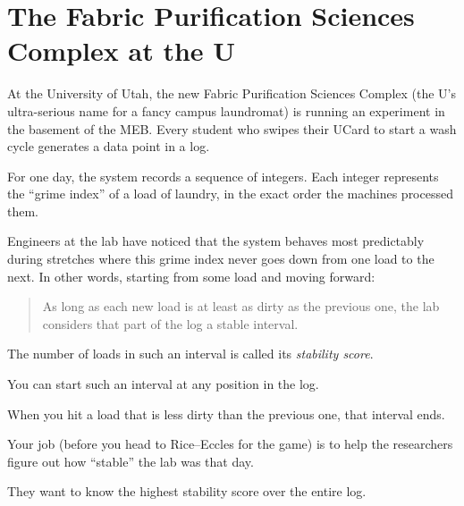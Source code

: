 \section*{The Fabric Purification Sciences Complex at the U}

At the University of Utah, the new Fabric Purification Sciences Complex (the U's
ultra-serious name for a fancy campus laundromat) is running an experiment in
the basement of the MEB. Every student who swipes their UCard to start a wash
cycle generates a data point in a log.

For one day, the system records a sequence of integers. Each integer represents
the ``grime index'' of a load of laundry, in the exact order the machines
processed them.

Engineers at the lab have noticed that the system behaves most predictably
during stretches where this grime index never goes down from one load to the
next. In other words, starting from some load and moving forward:
\begin{quote}
As long as each new load is at least as dirty as the previous one, the lab
considers that part of the log a stable interval.
\end{quote}

The number of loads in such an interval is called its \emph{stability score}.

You can start such an interval at any position in the log.

When you hit a load that is less dirty than the previous one, that interval
ends.

Your job (before you head to Rice--Eccles for the game) is to help the
researchers figure out how ``stable'' the lab was that day.

They want to know the highest stability score over the entire log.